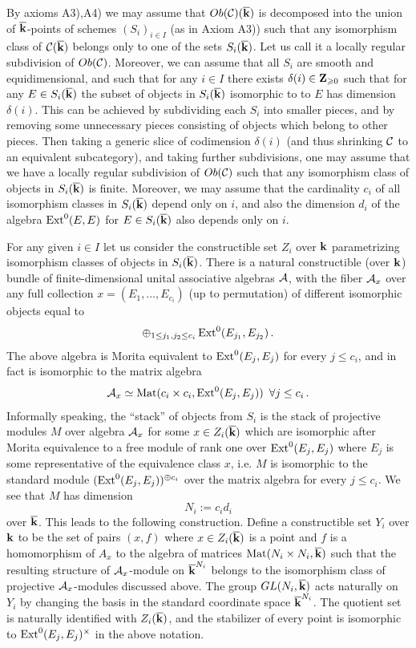 \documentclass[12pt]{article}
\begin{document}
By axioms A3),A4) we may assume that $Ob({\mathcal C})({\overline{\bf k}})$ is decomposed into the union of ${\overline{\bf k}}$-points of schemes $(S_i)_{i\in I}$ (as in Axiom A3)) such that any isomorphism class
 of ${\mathcal C}({\overline{\bf k}})$ belongs only to one of the sets $S_i({\overline{\bf k}})$.  Let us call it a locally regular subdivision of $Ob({\mathcal C})$. 
Moreover, we can assume
that all $S_i$ are smooth and equidimensional, and such that for any $i\in I$ there exists $\delta(i)\in {\bf Z}_{\geqslant 0}$
such that for  any $E\in S_i({\overline{\bf k}})$ the subset
 of objects in $S_i({\overline{\bf k}})$ isomorphic to to $E$ has dimension $\delta(i)$. This can be achieved by subdividing each $S_i$ into smaller pieces, 
 and by removing some unnecessary pieces consisting of objects which belong to other pieces.
Then taking a generic slice of codimension $\delta(i)$ (and thus shrinking ${\mathcal C}$ to an equivalent subcategory),
 and taking further subdivisions,
 one may assume that we have a locally regular subdivision of $Ob({\mathcal C})$ such that any isomorphism class of objects in $S_i({\overline{\bf k}})$ is finite.
Moreover, we may assume that the cardinality $c_i$ of all isomorphism classes in $S_i({\overline{\bf k}})$ depend only on $i$, and also the dimension $d_i$
 of the algebra $\operatorname{Ext}^0(E,E)$ for $E\in S_i({\overline{\bf k}})$ also depends only on $i$.

For any given $i\in I$ let us consider the  constructible set $Z_i$ over ${\bf k}$ parametrizing isomorphism classes of objects in $S_i({\overline{\bf k}})$. There is a natural 
constructible (over ${\bf k}$) bundle of finite-dimensional unital associative algebras $\cal A$, with the fiber ${\cal A}_x$ over any full collection $x=(E_1,\dots, E_{c_i})$
 (up to permutation) of different isomorphic objects equal to 
$$\oplus_{1\le j_1,j_2\le c_i} \operatorname{Ext}^0(E_{j_1},E_{j_2})\,.$$
The above algebra is Morita equivalent to $\operatorname{Ext}^0(E_j,E_j)$ for every $j\le c_i$, and in fact is isomorphic to the matrix algebra 
 $${\cal A}_x\simeq \operatorname{Mat}(c_i\times c_i, \operatorname{Ext}^0(E_j,E_j))\,\,\,\forall j\le c_i\,.$$
Informally speaking, the ``stack'' of objects from $S_i$
 is the stack of projective modules $M$ over algebra ${\cal A}_x$ for some $x\in Z_i({\overline{\bf k}})$ which are isomorphic after Morita equivalence to
 a free module of rank one over $\operatorname{Ext}^0(E_j,E_j)$ where $E_j$ is some representative of the equivalence class $x$, i.e. $M$ is isomorphic
to the standard module $(\operatorname{Ext}^0(E_j,E_j))^{\oplus c_i}$ over the matrix algebra for every $j\le c_i$. We see
 that $M$ has dimension 
$$N_i:=c_i d_i$$ over ${\overline{\bf k}}$. This leads to the following construction. Define a constructible set $Y_i$ over ${\bf k}$ to be the
 set of pairs $(x,f)$ where $x\in Z_i({\overline{\bf k}})$ is a point and $f$ is a homomorphism of $A_x$ to the algebra of matrices $\operatorname{Mat}(N_i\times N_i,{\overline{\bf k}})$
 such that the resulting structure of ${\cal A}_x$-module on ${\overline{\bf k}}^{N_i}$ belongs to the isomorphism class of projective ${\cal A}_x$-modules discussed above.
 The group $GL(N_i,{\overline{\bf k}})$ acts naturally on $Y_i$ by changing the basis in the standard coordinate space ${\overline{\bf k}}^{N_i}$.
 The quotient set is naturally identified with $Z_i({\overline{\bf k}})$, and the stabilizer of every point is isomorphic to  $\operatorname{Ext}^0(E_j,E_j)^\times$ in the above notation.
\end{document}
